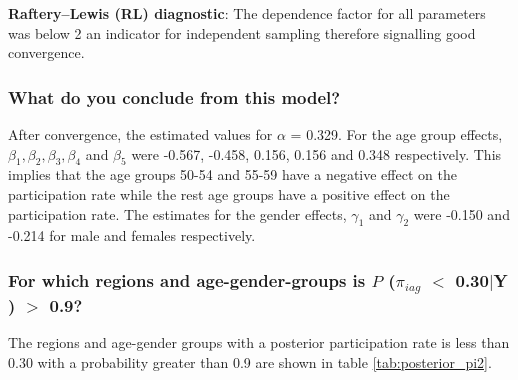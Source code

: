 \documentclass[12pt]{article}
\begin{document}
\textbf{Raftery–Lewis (RL) diagnostic}: The dependence factor for all parameters was below 2 an indicator for independent sampling therefore signalling good convergence.

\subsubsection{What do you conclude from this model?}

After convergence, the estimated values for $\alpha$ = 0.329. For the age group effects, $\beta_1, \beta_2, \beta_3, \beta_4$ and  $\beta_5$ were -0.567, -0.458, 0.156, 0.156 and 0.348 respectively. This implies that the age groups 50-54 and 55-59 have a negative effect on the participation rate while the rest age groups have a positive effect on the participation rate. The estimates for the gender effects, $\gamma_1$ and $\gamma_2$ were -0.150 and -0.214 for male and females respectively.   

\subsubsection{For which regions and age-gender-groups is $P$ ($\pi_{iag}$ $<$ 0.30$|$Y ) $>$ 0.9?}

The regions and age-gender groups with a posterior participation rate is less than 0.30 with a probability greater than 0.9 are shown in table \ref{tab:posterior_pi2}.
\end{document}
